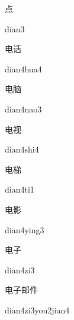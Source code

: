 \begin{verbete}[dian3]{点}
\begin{pronuncia}{dian3}
\end{pronuncia}
\end{verbete}

\begin{verbete}{电话}
\begin{pronuncia}{dian4hua4}
\end{pronuncia}
\end{verbete}

\begin{verbete}{电脑}
\begin{pronuncia}{dian4nao3}
\end{pronuncia}
\end{verbete}

\begin{verbete}{电视}
\begin{pronuncia}{dian4shi4}
\end{pronuncia}
\end{verbete}

\begin{verbete}[dian4ti1]{电梯}
\begin{pronuncia}{dian4ti1}
\end{pronuncia}
\end{verbete}

\begin{verbete}{电影}
\begin{pronuncia}{dian4ying3}
\end{pronuncia}
\end{verbete}

\begin{verbete}[dian4zi3]{电子}
\begin{pronuncia}{dian4zi3}
\end{pronuncia}
\end{verbete}

\begin{verbete}{电子邮件}
\begin{pronuncia}{dian4zi3you2jian4}
\end{pronuncia}
\end{verbete}

